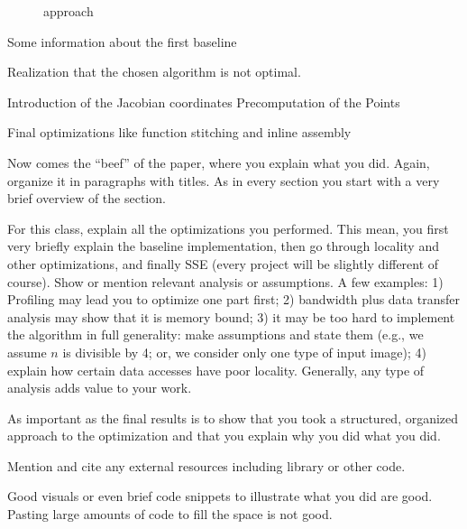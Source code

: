 \begin{figure}[h!]
\caption{approach\label{fig:method}}
\end{figure}

Some information about the first baseline


Realization that the chosen algorithm is not optimal.

Introduction of the Jacobian coordinates
Precomputation of the Points

Final optimizations like function stitching and inline assembly 

Now comes the ``beef'' of the paper, where you explain what you
did. Again, organize it in paragraphs with titles. As in every section
you start with a very brief overview of the section.

For this class, explain all the optimizations you performed. This mean, you first very briefly
explain the baseline implementation, then go through locality and other optimizations, and finally SSE (every project will be slightly different of course). Show or mention relevant analysis or assumptions. A few examples: 1) Profiling may lead you to optimize one part first; 2) bandwidth plus data transfer analysis may show that it is memory bound; 3) it may be too hard to implement the algorithm in full generality: make assumptions and state them (e.g., we assume $n$ is divisible by 4; or, we consider only one type of input image); 4) explain how certain data accesses have poor locality. Generally, any type of analysis adds value to your work.

As important as the final results is to show that you took a structured, organized approach to the optimization and that you explain why you did what you did.

Mention and cite any external resources including library or other code.

Good visuals or even brief code snippets to illustrate what you did are good. Pasting large amounts of code to fill the space is not good.